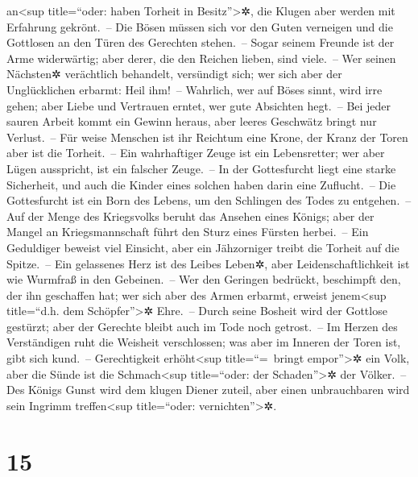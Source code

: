 an\textless sup title=``oder: haben Torheit in Besitz''\textgreater✲,
die Klugen aber werden mit Erfahrung gekrönt.~-- Die
Bösen müssen sich vor den Guten verneigen und die Gottlosen an den Türen
des Gerechten stehen.~-- Sogar seinem Freunde ist der
Arme widerwärtig; aber derer, die den Reichen lieben, sind viele.~--
Wer seinen Nächsten✲ verächtlich behandelt, versündigt
sich; wer sich aber der Unglücklichen erbarmt: Heil ihm!~--
Wahrlich, wer auf Böses sinnt, wird irre gehen; aber
Liebe und Vertrauen erntet, wer gute Absichten hegt.~--
Bei jeder sauren Arbeit kommt ein Gewinn heraus, aber
leeres Geschwätz bringt nur Verlust.~-- Für weise
Menschen ist ihr Reichtum eine Krone, der Kranz der Toren aber ist die
Torheit.~-- Ein wahrhaftiger Zeuge ist ein Lebensretter;
wer aber Lügen ausspricht, ist ein falscher Zeuge.~-- In
der Gottesfurcht liegt eine starke Sicherheit, und auch die Kinder eines
solchen haben darin eine Zuflucht.~-- Die Gottesfurcht
ist ein Born des Lebens, um den Schlingen des Todes zu entgehen.~--
Auf der Menge des Kriegsvolks beruht das Ansehen eines
Königs; aber der Mangel an Kriegsmannschaft führt den Sturz eines
Fürsten herbei.~-- Ein Geduldiger beweist viel Einsicht,
aber ein Jähzorniger treibt die Torheit auf die Spitze.~--
Ein gelassenes Herz ist des Leibes Leben✲, aber
Leidenschaftlichkeit ist wie Wurmfraß in den Gebeinen.~--
Wer den Geringen bedrückt, beschimpft den, der ihn
geschaffen hat; wer sich aber des Armen erbarmt, erweist
jenem\textless sup title=``d.h. dem Schöpfer''\textgreater✲ Ehre.~--
Durch seine Bosheit wird der Gottlose gestürzt; aber der
Gerechte bleibt auch im Tode noch getrost.~-- Im Herzen
des Verständigen ruht die Weisheit verschlossen; was aber im Inneren der
Toren ist, gibt sich kund.~-- Gerechtigkeit
erhöht\textless sup title=``=~bringt empor''\textgreater✲ ein Volk, aber
die Sünde ist die Schmach\textless sup title=``oder: der
Schaden''\textgreater✲ der Völker.~-- Des Königs Gunst
wird dem klugen Diener zuteil, aber einen unbrauchbaren wird sein
Ingrimm treffen\textless sup title=``oder: vernichten''\textgreater✲.

\hypertarget{section-14}{%
\section{15}\label{section-14}}

